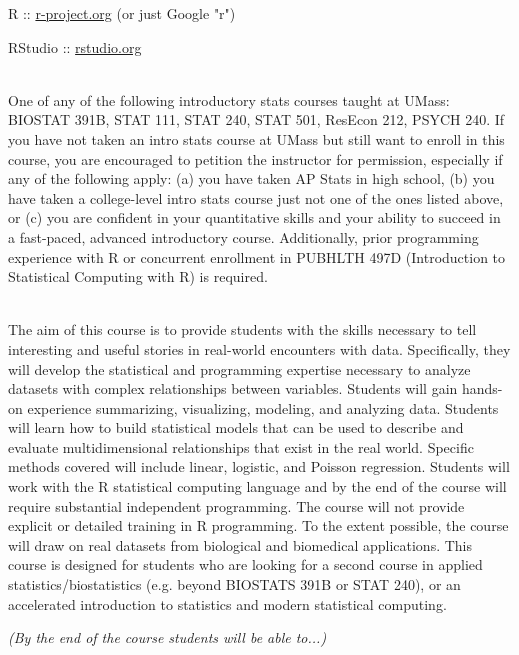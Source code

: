 \documentclass[10pt]{article}
\begin{document}

R :: \href{http://www.r-project.org}{r-project.org} (or just Google "r")

RStudio :: \href{http://www.rstudio.org}{rstudio.org}


\bigskip
{}\\
One of any of the following introductory stats courses taught at UMass: BIOSTAT 391B, STAT 111, STAT 240, STAT 501, ResEcon 212, PSYCH 240. If you have not taken an intro stats course at UMass but still want to enroll in this course, you are encouraged to petition the instructor for permission, especially if any of the following apply: (a) you have taken AP Stats in high school, (b) you have taken a college-level intro stats course just not one of the ones listed above, or (c) you are confident in your quantitative skills and your ability to succeed in a fast-paced, advanced introductory course. Additionally, prior programming experience with R or concurrent enrollment in PUBHLTH 497D (Introduction to Statistical Computing with R) is required.


\bigskip
{}\\ 
The aim of this course is to provide students with the skills necessary to tell interesting and useful stories in real-world encounters with data. Specifically, they will develop the statistical and programming expertise necessary to analyze datasets with complex relationships between variables. Students will gain hands-on experience summarizing, visualizing, modeling, and analyzing data. Students will learn how to build statistical models that can be used to describe and evaluate multidimensional relationships that exist in the real world. Specific methods covered will include linear, logistic, and Poisson regression. Students will work with the R statistical computing language and by the end of the course will require substantial independent programming. The course will not provide explicit or detailed training in R programming. To the extent possible, the course will draw on real datasets from biological and biomedical applications. This course is designed for students who are looking for a second course in applied statistics/biostatistics (e.g. beyond BIOSTATS 391B or STAT 240), or an accelerated introduction to statistics and modern statistical computing.


\bigskip
{} {\em (By the end of the course students will be able to...)}
\end{document}
